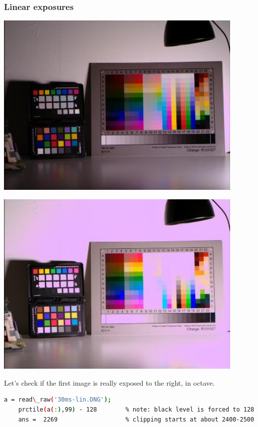 \subsubsection{Linear exposures}

\begin{center}
\includegraphics[height=9cm]{images/30ms-lin}
\end{center}

\begin{center}
\includegraphics[height=9cm]{images/100ms-lin}
\end{center}

Let's check if the first image is really exposed to the right, in octave.  

\begin{lstlisting}[language=bash,morekeywords=$,keywordstyle=\bfseries,frame=none,xleftmargin=.25in,belowskip=2em, aboveskip=2em]
    a = read\_raw('30ms-lin.DNG');
    prctile(a(:),99) - 128        % note: black level is forced to 128 in raw2dng
    ans =  2269                   % clipping starts at about 2400-2500 above black
\end{lstlisting}

